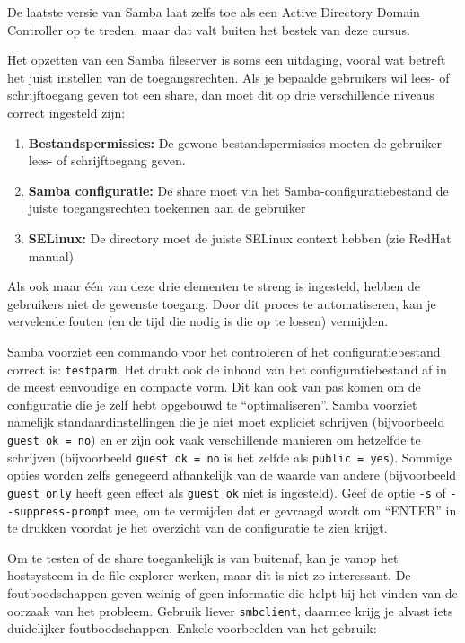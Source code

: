 De laatste versie van Samba laat zelfs toe als een Active Directory Domain Controller op te treden, maar dat valt buiten het bestek van deze cursus.

Het opzetten van een Samba fileserver \autocite{VanVreckem2014,VernooijEtAl2010} is soms een uitdaging, vooral wat betreft het juist instellen van de toegangsrechten. Als je bepaalde gebruikers wil lees- of schrijftoegang geven tot een share, dan moet dit op drie verschillende niveaus correct ingesteld zijn:

\begin{enumerate}
\def\labelenumi{\arabic{enumi}.}
\item \textbf{Bestandspermissies:} De gewone bestandspermissies moeten de gebruiker lees- of schrijftoegang geven.
\item \textbf{Samba configuratie:} De share moet via het Samba-configuratiebestand  de juiste toegangsrechten toekennen aan de gebruiker
\item \textbf{SELinux:} De directory moet de juiste SELinux context hebben (zie RedHat manual)
\end{enumerate}

Als ook maar één van deze drie elementen te streng is ingesteld, hebben de gebruikers niet de gewenste toegang. Door dit proces te automatiseren, kan je vervelende fouten (en de tijd die nodig is die op te lossen) vermijden.

Samba voorziet een commando voor het controleren of het configuratiebestand  correct is: \texttt{testparm}. Het drukt ook de inhoud van het configuratiebestand af in de meest eenvoudige en compacte vorm. Dit kan ook van pas komen om de configuratie die je zelf hebt opgebouwd te ``optimaliseren''. Samba voorziet namelijk standaardinstellingen die je niet moet expliciet schrijven (bijvoorbeeld \texttt{guest\ ok\ =\ no}) en er zijn ook vaak verschillende manieren om hetzelfde te schrijven (bijvoorbeeld \texttt{guest\ ok\ =\ no} is het zelfde als \texttt{public\ =\ yes}). Sommige opties worden zelfs genegeerd afhankelijk van de waarde van andere (bijvoorbeeld \texttt{guest\ only} heeft geen effect als \texttt{guest\ ok} niet is ingesteld). Geef de optie \texttt{-s} of \verb|--suppress-prompt| mee, om te vermijden dat er gevraagd wordt om ``ENTER'' in te drukken voordat je het overzicht van de configuratie te zien krijgt.

Om te testen of de share toegankelijk is van buitenaf, kan je vanop het hostsysteem in de file explorer werken, maar dit is niet zo interessant.  De foutboodschappen geven weinig of geen informatie die helpt bij het vinden van de oorzaak van het probleem. Gebruik liever \texttt{smbclient}, daarmee krijg je alvast iets duidelijker foutboodschappen. Enkele voorbeelden van het gebruik:

